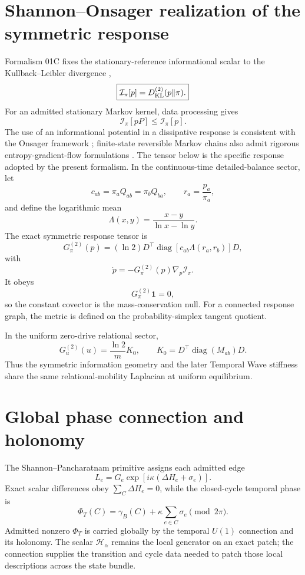\section{Shannon--Onsager realization of the symmetric response}
Formalism 01C fixes the stationary-reference informational scalar to the Kullback--Leibler divergence \cite{KullbackLeibler1951},
\[
\boxed{
\mathcal I_\pi[p]=D_{\rm KL}^{(2)}(p\|\pi).
}
\]
For an admitted stationary Markov kernel, data processing gives
\[
\mathcal I_\pi[pP]\le\mathcal I_\pi[p].
\]
The use of an informational potential in a dissipative response is consistent with the Onsager framework \cite{Onsager1931}; finite-state reversible Markov chains also admit rigorous entropy-gradient-flow formulations \cite{Maas2011}. The tensor below is the specific response adopted by the present formalism. In the continuous-time detailed-balance sector, let
\[
c_{ab}=\pi_aQ_{ab}=\pi_bQ_{ba},
\qquad
r_a=\frac{p_a}{\pi_a},
\]
and define the logarithmic mean
\[
\Lambda(x,y)=\frac{x-y}{\ln x-\ln y}.
\]
The exact symmetric response tensor is
\[
\boxed{
G^{(2)}_\pi(p)
=(\ln2)D^\top
\operatorname{diag}[c_{ab}\Lambda(r_a,r_b)]D,
}
\]
with
\[
\boxed{
\dot p=-G^{(2)}_\pi(p)\nabla_p\mathcal I_\pi.
}
\]
It obeys
\[
G^{(2)}_\pi\mathbf1=0,
\]
so the constant covector is the mass-conservation null. For a connected response graph, the metric is defined on the probability-simplex tangent quotient.

In the uniform zero-drive relational sector,
\[
\boxed{
G^{(2)}_u(u)=\frac{\ln2}{m}K_0,
\qquad
K_0=D^\top\operatorname{diag}(M_{ab})D.
}
\]
Thus the symmetric information geometry and the later Temporal Wave stiffness share the same relational-mobility Laplacian at uniform equilibrium.

\section{Global phase connection and holonomy}
The Shannon--Pancharatnam primitive assigns each admitted edge
\[
L_e=G_e\exp\!\left[i\kappa(\Delta H_e+\sigma_e)\right].
\]
Exact scalar differences obey \(\sum_C\Delta H_e=0\), while the closed-cycle temporal phase is
\[
\boxed{
\Phi_T(C)=\gamma_B(C)+\kappa\sum_{e\in C}\sigma_e\pmod{2\pi}.
}
\]
Admitted nonzero \(\Phi_T\) is carried globally by the temporal \(U(1)\) connection and its holonomy. The scalar \(\mathcal H_\alpha\) remains the local generator on an exact patch; the connection supplies the transition and cycle data needed to patch those local descriptions across the state bundle.

